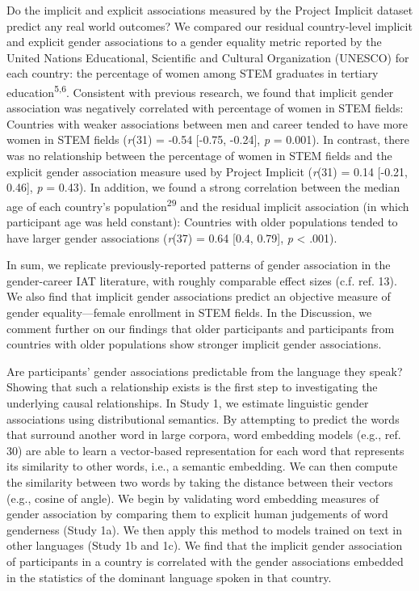 \documentclass[11pt]{wlscirep}
\begin{document}
Do the implicit and explicit associations measured by the Project Implicit
dataset predict any real world outcomes? We compared our residual
country-level implicit and explicit gender associations to a gender equality
metric reported by the United Nations Educational, Scientific and
Cultural Organization (UNESCO) for each country: the percentage of women
among STEM graduates in tertiary education\textsuperscript{5,6}.  Consistent with previous research, we found that implicit gender association was negatively
correlated with percentage of women in STEM fields: Countries with
weaker associations between men and career tended to have more women in STEM fields (\emph{r}(31) = -0.54 {[}-0.75, -0.24{]}, \emph{p} = 0.001). In contrast, there was no
relationship between the percentage of women in STEM fields and the
explicit gender association measure used by Project Implicit (\emph{r}(31) = 0.14 {[}-0.21, 0.46{]}, \emph{p} = 0.43). In addition, we found a strong correlation between the
median age of each country's population\textsuperscript{29} and the residual implicit association (in which participant age
was held constant): Countries with older populations tended to have
larger gender associations (\emph{r}(37) = 0.64 {[}0.4, 0.79{]}, \emph{p} \textless{} .001).


In sum, we replicate previously-reported patterns of gender association in the
gender-career IAT literature, with roughly comparable effect sizes (c.f. ref. 13). We also find that implicit gender associations predict an objective measure of gender equality---female enrollment in STEM fields. In the Discussion, we comment further on our findings that older participants and participants from countries with older populations show stronger implicit gender associations.

Are participants' gender associations predictable from the language they
speak? Showing that such a relationship exists is the first step to investigating the underlying causal relationships. In Study 1, we estimate linguistic gender associations using distributional semantics. By attempting to predict the words that surround another word in large corpora,  word embedding models  (e.g., ref. 30) are able to learn a vector-based representation for each word that represents its similarity to other words, i.e., a semantic embedding. We can then compute the similarity between two words by taking the distance between their vectors (e.g., cosine of angle). We begin by validating word embedding measures of
gender association by comparing them to explicit human judgements of word
genderness (Study 1a). We then apply this method to models trained on
text in other languages (Study 1b and 1c). We find that the implicit gender
association of participants in a country is correlated with the gender associations embedded in the statistics of the dominant language spoken in that country.
\end{document}
